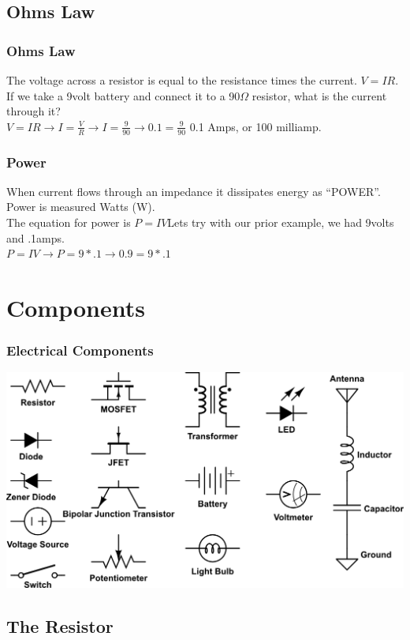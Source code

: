 \documentclass[10pt, handout]{beamer}
\begin{document}
\subsection{Ohms Law}

\begin{frame}
\frametitle{Ohms Law}
The voltage across a resistor is equal to the resistance times the current. $V=IR$.\\
If we take a 9volt battery and connect it to a 90$\Omega$ resistor, what is the current through it?\pause\\
$V=IR\to I=\frac{V}{R}\to I=\frac{9}{90}$\pause$\to 0.1=\frac{9}{90}$ 0.1 Amps, or 100 milliamp.
\end{frame}

\begin{frame}
\frametitle{Power}
When current flows through an impedance it dissipates energy as ``POWER''. Power is measured Watts (W).\\
The equation for power is $P=IV$\pause Lets try with our prior example, we had 9volts and .1amps.\\
$P=IV \to P=9*.1$\pause$\to 0.9=9*.1$
\end{frame}

\section{Components}

\begin{frame}
\frametitle{Electrical Components}
\begin{center}
\includegraphics[width=\textwidth]{components.png}
\end{center}
\end{frame}

\subsection{The Resistor}
\end{document}
